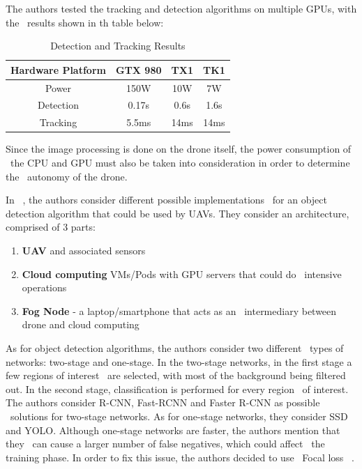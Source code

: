 The authors tested the tracking and detection algorithms on multiple GPUs, with the \
results shown in th table below:

\begin{table}[ht]
    \caption{Detection and Tracking Results}
    \centering
    \begin{tabular}{|c|c|c|c|}
        \hline\hline
        Hardware Platform & GTX 980 & TX1 & TK1 \\
        \hline
        Power & 150W & 10W & 7W \\
        Detection & 0.17s & 0.6s & 1.6s \\
        Tracking & 5.5ms & 14ms & 14ms \\
        \hline
    \end{tabular}
    \label{table:deep-drone-results}
\end{table}

Since the image processing is done on the drone itself, the power consumption of \
the CPU and GPU must also be taken into consideration in order to determine the \
autonomy of the drone.

In ~\cite{drone3}, the authors consider different possible implementations \
for an object detection algorithm that could be used by UAVs.
They consider an architecture, comprised of 3 parts:
\begin{enumerate}
    \item \textbf{UAV} and associated sensors
    \item \textbf{Cloud computing} VMs/Pods with GPU servers that could do \
            intensive operations
    \item \textbf{Fog Node} - a laptop/smartphone that acts as an \
            intermediary between drone and cloud computing
\end{enumerate}

As for object detection algorithms, the authors consider two different \
types of networks: two-stage and one-stage.
In the two-stage networks, in the first stage a few regions of interest \
are selected, with most of the background being filtered out.
In the second stage, classification is performed for every region \
of interest.
The authors consider R-CNN, Fast-RCNN and Faster R-CNN as possible \
solutions for two-stage networks.
As for one-stage networks, they consider SSD and YOLO.
Although one-stage networks are faster, the authors mention that they \
can cause a larger number of false negatives, which could affect \
the training phase.
In order to fix this issue, the authors decided to use \
Focal loss ~\cite{focalLoss}.

